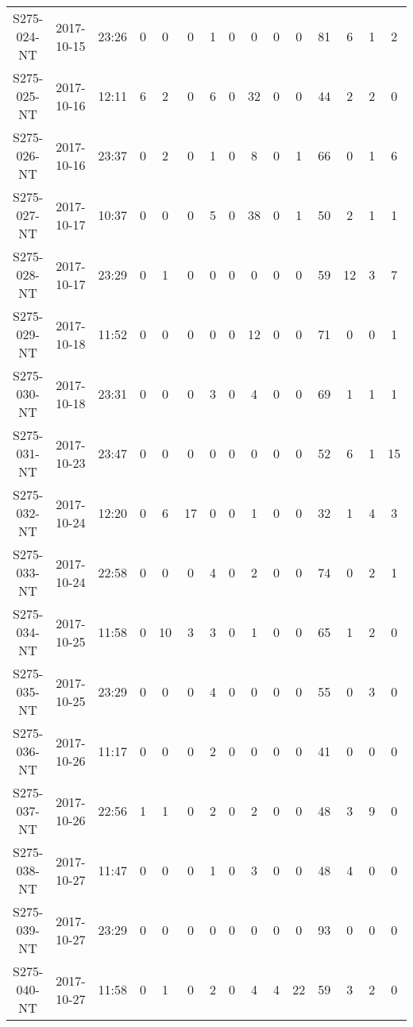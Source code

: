 \begin{longtable}{ccccccccccccccc}
  S275-024-NT & 2017-10-15 & 23:26 & 0 & 0 & 0 & 1 & 0 & 0 & 0 & 0 & 81 & 6 & 1 & 2 \\ 
  S275-025-NT & 2017-10-16 & 12:11 & 6 & 2 & 0 & 6 & 0 & 32 & 0 & 0 & 44 & 2 & 2 & 0 \\ 
  S275-026-NT & 2017-10-16 & 23:37 & 0 & 2 & 0 & 1 & 0 & 8 & 0 & 1 & 66 & 0 & 1 & 6 \\ 
  S275-027-NT & 2017-10-17 & 10:37 & 0 & 0 & 0 & 5 & 0 & 38 & 0 & 1 & 50 & 2 & 1 & 1 \\ 
  S275-028-NT & 2017-10-17 & 23:29 & 0 & 1 & 0 & 0 & 0 & 0 & 0 & 0 & 59 & 12 & 3 & 7 \\ 
  S275-029-NT & 2017-10-18 & 11:52 & 0 & 0 & 0 & 0 & 0 & 12 & 0 & 0 & 71 & 0 & 0 & 1 \\ 
  S275-030-NT & 2017-10-18 & 23:31 & 0 & 0 & 0 & 3 & 0 & 4 & 0 & 0 & 69 & 1 & 1 & 1 \\ 
  S275-031-NT & 2017-10-23 & 23:47 & 0 & 0 & 0 & 0 & 0 & 0 & 0 & 0 & 52 & 6 & 1 & 15 \\ 
  S275-032-NT & 2017-10-24 & 12:20 & 0 & 6 & 17 & 0 & 0 & 1 & 0 & 0 & 32 & 1 & 4 & 3 \\ 
  S275-033-NT & 2017-10-24 & 22:58 & 0 & 0 & 0 & 4 & 0 & 2 & 0 & 0 & 74 & 0 & 2 & 1 \\ 
  S275-034-NT & 2017-10-25 & 11:58 & 0 & 10 & 3 & 3 & 0 & 1 & 0 & 0 & 65 & 1 & 2 & 0 \\ 
  S275-035-NT & 2017-10-25 & 23:29 & 0 & 0 & 0 & 4 & 0 & 0 & 0 & 0 & 55 & 0 & 3 & 0 \\ 
  S275-036-NT & 2017-10-26 & 11:17 & 0 & 0 & 0 & 2 & 0 & 0 & 0 & 0 & 41 & 0 & 0 & 0 \\ 
  S275-037-NT & 2017-10-26 & 22:56 & 1 & 1 & 0 & 2 & 0 & 2 & 0 & 0 & 48 & 3 & 9 & 0 \\ 
  S275-038-NT & 2017-10-27 & 11:47 & 0 & 0 & 0 & 1 & 0 & 3 & 0 & 0 & 48 & 4 & 0 & 0 \\ 
  S275-039-NT & 2017-10-27 & 23:29 & 0 & 0 & 0 & 0 & 0 & 0 & 0 & 0 & 93 & 0 & 0 & 0 \\ 
  S275-040-NT & 2017-10-27 & 11:58 & 0 & 1 & 0 & 2 & 0 & 4 & 4 & 22 & 59 & 3 & 2 & 0 \\ 
  \hline
\end{longtable}

